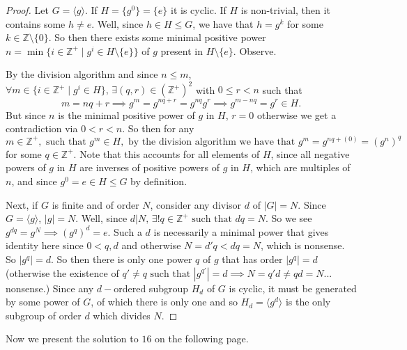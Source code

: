 \documentclass[addpoints,10pt]{exam}
\theoremstyle{plain}
\theoremstyle{definition}
\theoremstyle{plain}
\theoremstyle{plain}
\theoremstyle{definition}
\newcommand{\ZZ}{\ensuremath{\mathbb{Z}}}
\begin{document}
\begin{proof}
  Let $G=\langle g\rangle$. If $H=\{g^{0}\}=\{e\}$ it is cyclic. If $H$ is non-trivial, then it contains some $h\neq e.$ Well, since $h\in H\leq G$, we have that $h=g^{k}$ for some $k\in\ZZ\setminus\{0\}$. So then there exists some minimal positive power $n=\min \{i\in \ZZ^{+}\mid g^{i}\in H\setminus \{e\}\}$ of $g$ present in $H\setminus\{e\}$. Observe.

  By the division algorithm and since $n\leq m$, $\forall m\in \{i\in \ZZ^{+}\mid g^{i}\in H\},\,\exists (q,r)\in (\ZZ^{+})^{2}$ with $0\leq r<n$ such that
  $$m=nq+r\implies g^{m}=g^{nq+r}=g^{nq}g^{r}\implies g^{m-nq}=g^{r}\in H.$$
  But since $n$ is the minimal positive power of $g$ in $H$, $r=0$ otherwise we get a contradiction via $0<r<n$. So then for any $m\in \ZZ^{+},\text{ such that }g^{m}\in H,\text{ by the division algorithm we have that }g^{m}=g^{nq+(0)}=(g^{n})^{q}$ for some $q\in \ZZ^{+}$. Note that this accounts for all elements of $H$, since all negative powers of $g$ in $H$ are inverses of positive powers of $g$ in $H$, which are multiples of $n$, and since $g^{0}=e\in H\leq G$ by definition.

  Next, if $G$ is finite and of order $N$, consider any divisor $d$ of $|G|=N$. Since $G=\langle g\rangle$, $|g|=N$. Well, since $d|N,\,\exists!q\in \ZZ^{+}\text{ such that }dq=N$. So we see $g^{dq}=g^{N}\implies (g^{q})^{d}=e$. Such a $d$ is necessarily a minimal power that gives identity here since $0<q,d$ and otherwise $N=d'q<dq=N$, which is nonsense. So $|g^{q}|=d.$ So then there is only one power $q$ of $g$ that has order $|g^{q}|=d$ (otherwise the existence of $q'\neq q\text{ such that }|g^{q'}|=d\implies N=q'd\neq qd=N$... nonsense.) Since any $d-$ordered subgroup $H_{d}$ of $G$ is cyclic, it must be generated by some power of $G$, of which there is only one and so $H_{d}=\langle g^{d}\rangle$ is the only subgroup of order $d$ which divides $N.$
   
\end{proof}
Now we present the solution to $16$ on the following page.
\newpage
\setcounter{thm}{15}   %
\end{document}
